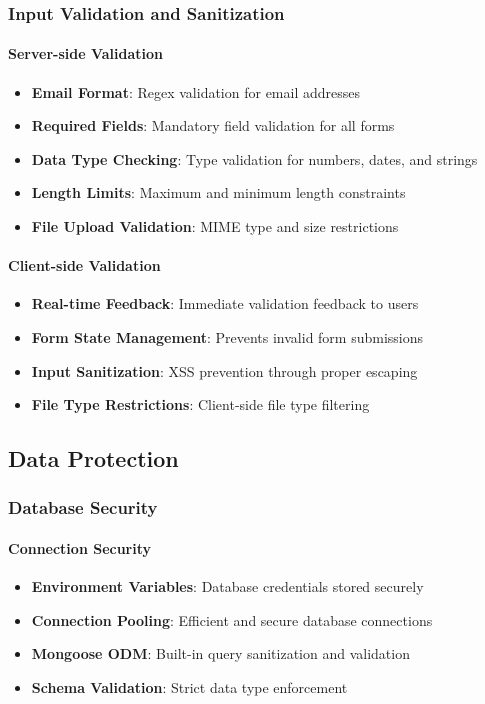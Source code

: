 \documentclass[12pt,a4paper]{article}
\begin{document}
\subsubsection{Input Validation and Sanitization}
\label{subsubsec:input-validation}

\paragraph{Server-side Validation}
\begin{itemize}
\item \textbf{Email Format}: Regex validation for email addresses
\item \textbf{Required Fields}: Mandatory field validation for all forms
\item \textbf{Data Type Checking}: Type validation for numbers, dates, and strings
\item \textbf{Length Limits}: Maximum and minimum length constraints
\item \textbf{File Upload Validation}: MIME type and size restrictions
\end{itemize}

\paragraph{Client-side Validation}
\begin{itemize}
\item \textbf{Real-time Feedback}: Immediate validation feedback to users
\item \textbf{Form State Management}: Prevents invalid form submissions
\item \textbf{Input Sanitization}: XSS prevention through proper escaping
\item \textbf{File Type Restrictions}: Client-side file type filtering
\end{itemize}

\subsection{Data Protection}
\label{subsec:data-protection}

\subsubsection{Database Security}
\label{subsubsec:database-security}

\paragraph{Connection Security}
\begin{itemize}
\item \textbf{Environment Variables}: Database credentials stored securely
\item \textbf{Connection Pooling}: Efficient and secure database connections
\item \textbf{Mongoose ODM}: Built-in query sanitization and validation
\item \textbf{Schema Validation}: Strict data type enforcement
\end{itemize}
\end{document}
